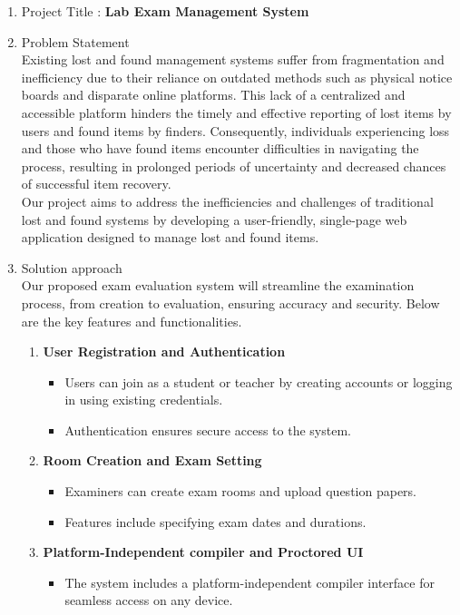 \documentclass[14pt]{article}
\begin{document}
\begin{enumerate}
\item Project Title : \textbf{Lab Exam Management System}
\item Problem Statement \\
\tabto{.5cm}Existing lost and found management systems suffer from fragmentation and
inefficiency due to their reliance on outdated methods such as physical notice
boards and disparate online platforms. This lack of a centralized and accessible
platform hinders the timely and effective reporting of lost items by users and found
items by finders. Consequently, individuals experiencing loss and those who have
found items encounter difficulties in navigating the process, resulting in prolonged
periods of uncertainty and decreased chances of successful item recovery.\\
\tabto{.5cm} Our project aims to address the inefficiencies and challenges of traditional lost and found systems by developing a user-friendly, single-page web application designed to manage lost and found items.
\item Solution approach \\
\tabto{.5cm}Our proposed exam evaluation system will streamline the examination process, from creation to evaluation, ensuring accuracy and security. Below are the key features and functionalities.
\begin{enumerate}
\item \textbf{User Registration and Authentication}
\begin{itemize}
\item Users can join as a student or teacher by creating accounts or logging in using existing credentials.
\item Authentication ensures secure access to the system.
\end{itemize}
\item \textbf{Room Creation and Exam Setting}
\begin{itemize}
\item Examiners can create exam rooms and upload question papers.
\item Features include specifying exam dates and durations.
\end{itemize}
\item \textbf{Platform-Independent compiler and Proctored UI}
\begin{itemize}
\item The system includes a platform-independent compiler interface for seamless access on any device.

\end{itemize}
\end{enumerate}
\end{enumerate}
\end{document}
